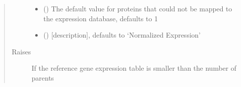 \documentclass[letterpaper,10pt,english]{sphinxmanual}
\begin{document}
\begin{fulllineitems}
\begin{quote}
\begin{description}
\begin{itemize}
\item {} 
 (\sphinxstyleliteralemphasis{\sphinxupquote{, }}) \textendash{} The default value for proteins that could not be mapped to the expression database, defaults to \sphinxhyphen{}1

\item {} 
 (\sphinxstyleliteralemphasis{\sphinxupquote{, }}) \textendash{} {[}description{]}, defaults to ‘Normalized Expression’

\end{itemize}

\item[{Raises}] \leavevmode
{} \textendash{} If the reference gene expression table is smaller than the number of parents

\end{description}\end{quote}

\end{fulllineitems}

\end{document}
